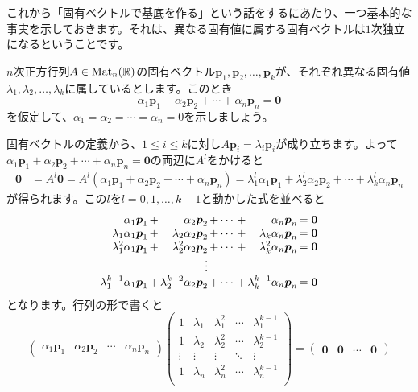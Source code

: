 これから「固有ベクトルで基底を作る」という話をするにあたり、一つ基本的な事実を示しておきます。それは、異なる固有値に属する固有ベクトルは$1$次独立になるということです。

$n$次正方行列$A \in \operatorname{Mat}_n(\mathbb{R})$の固有ベクトル$\bm{p}_1, \bm{p}_2, \ldots, \bm{p}_k$が、それぞれ異なる固有値$\lambda_1, \lambda_2, \ldots, \lambda_k$に属しているとします。このとき
\[
\alpha_1 \bm{p}_1 + \alpha_2 \bm{p}_2 + \cdots + \alpha_n \bm{p}_n = \bm{0}
\]
を仮定して、$\alpha_1 = \alpha_2 = \cdots = \alpha_n = 0$を示しましょう。

固有ベクトルの定義から、$1 \leq i \leq k$に対し$A\bm{p}_i = \lambda_i \bm{p}_i$が成り立ちます。よって$\alpha_1 \bm{p}_1 + \alpha_2 \bm{p}_2 + \cdots + \alpha_n \bm{p}_n = \bm{0}$の両辺に$A^l$をかけると
\begin{align*}
\bm{0} &= A^l \bm{0} = A^l (\alpha_1 \bm{p}_1 + \alpha_2 \bm{p}_2 + \cdots + \alpha_n \bm{p}_n)
= \lambda_1^l \alpha_1 \bm{p}_1 +  \lambda_2^l \alpha_2 \bm{p}_2 + \cdots + \lambda_k^l \alpha_n \bm{p}_n
\end{align*}
が得られます。この$l$を$l = 0, 1, \ldots, k - 1$と動かした式を並べると
\begin{align*}
\begin{array}{r@{\,}c@{\,}r@{\,}c@{\,}c@{\,}c@{\,}r@{\,}c}
\alpha_1 \bm{p}_1 & + & \alpha_2 \bm{p}_2 & + & \cdots & + & \alpha_n \bm{p}_n  & = \bm{0} \\
\lambda_1 \alpha_1 \bm{p}_1 & + & \lambda_2 \alpha_2 \bm{p}_2 & + & \cdots & + & \lambda_k \alpha_n \bm{p}_n  &= \bm{0} \\
\lambda_1^2 \alpha_1 \bm{p}_1 & + & \lambda_2^2 \alpha_2 \bm{p}_2 & + & \cdots & + & \lambda_k^2 \alpha_n \bm{p}_n  &= \bm{0} \\
& & \vdots \\
\lambda_1^{k - 1} \alpha_1 \bm{p}_1 & + & \lambda_2^{k - 2} \alpha_2 \bm{p}_2 & + & \cdots & + & \lambda_k^{k - 1} \alpha_n \bm{p}_n  &= \bm{0}
\end{array}
\end{align*}
となります。行列の形で書くと
\[
\begin{pmatrix}
\alpha_1 \bm{p}_1 & \alpha_2 \bm{p}_2 & \cdots & \alpha_n \bm{p}_n
\end{pmatrix}
\begin{pmatrix}
1 & \lambda_1 & \lambda_1^2 & \cdots & \lambda_1^{k - 1} \\
1 & \lambda_2 & \lambda_2^2 & \cdots & \lambda_2^{k - 1} \\
\vdots & \vdots & \vdots & \ddots & \vdots \\
1 & \lambda_n & \lambda_n^2 & \cdots & \lambda_n^{k - 1} \\
\end{pmatrix}
=
\begin{pmatrix}
\bm{0} & \bm{0} & \cdots & \bm{0}
\end{pmatrix}
\]
